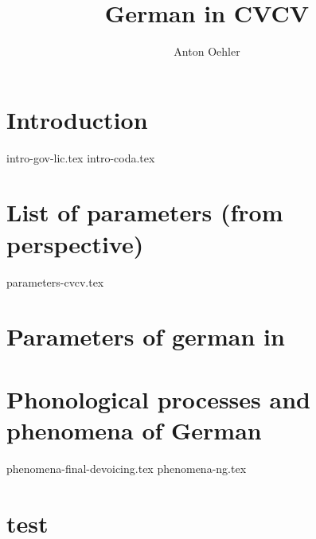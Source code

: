 \documentclass[
]{scrartcl}
\title{German in CVCV}
\author{Anton Oehler}
\begin{document}
\maketitle


\tableofcontents

\section{Introduction}
{intro-gov-lic.tex}
{intro-coda.tex}


\section{List of parameters (from \CVCV perspective)}
{parameters-cvcv.tex}

\section{Parameters of german in \CVCV}

\section{Phonological processes and phenomena of German}
{phenomena-final-devoicing.tex}
{phenomena-ng.tex}

\section{test}
 
\begin{structure}
    \wordstart
    \V{\textschwa}
    \fen

\end{structure}

\begin{structure}
    \wordstart
    \emptyV
    \V[floating]{\textschwa}
    \fen

\end{structure}

\begin{structure}
  \wordstart
  \emptyV
  \fen

\end{structure}

\printbibliography
\end{document}
